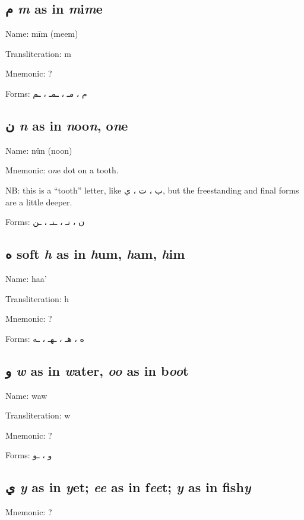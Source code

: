 \documentclass[11pt]{article}
\begin{document}
\subsection{ \textarabic{م} \textit{m} as in \textit{m}i\textit{m}e}

\noindent Name: mīm (meem)

\noindent Transliteration: m

\noindent Mnemonic:  ?

\noindent Forms: \textarabic{م ، مـ ، ـمـ ، ـم}

\subsection{ \textarabic{ن}  \textit{n} as in \textit{n}oo\textit{n}, o\textit{n}e}

\noindent Name: nûn (noon)

Mnemonic:  o\textit{n}e dot on a tooth.

NB: this is a “tooth” letter, like \textarabic{ب ، ت ، ي}, but the
freestanding and final forms are a little deeper.

\noindent Forms: \textarabic{ن ، نـ ، ـنـ ، ـن}

\subsection{ \textarabic{ه} soft \textit{h} as in  \textit{h}um, \textit{h}am, \textit{h}im }

\noindent Name: haa'

\noindent Transliteration: h

\noindent Mnemonic:  ?

\noindent Forms: \textarabic{ه ، هـ ، ـهـ ، ـه}

\subsection{ \textarabic{و} \textit{w} as in  \textit{w}ater,
  \textit{oo} as in b\textit{oo}t}

\noindent Name: waw

\noindent Transliteration: w

\noindent Mnemonic:  ?

\noindent Forms: \textarabic{و ، ـو}

\subsection{\textarabic{ي}  \textit{y} as in \textit{y}et;
  \textit{ee} as in f\textit{ee}t; \textit{y} as in fish\textit{y}}
Mnemonic:  ?
\end{document}

